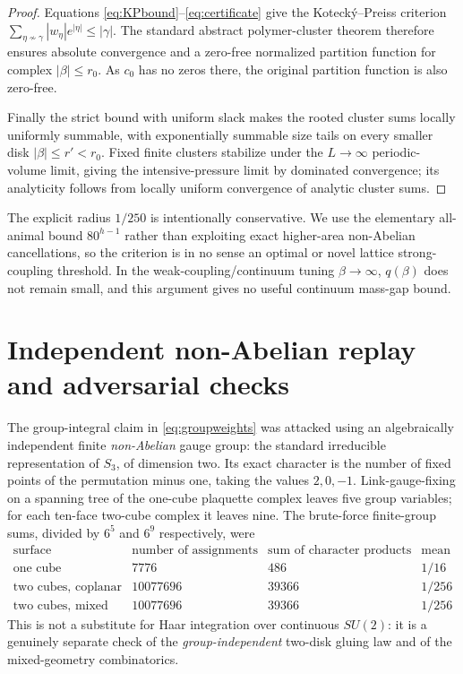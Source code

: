 \documentclass[11pt,a4paper]{article}
\begin{document}
\begin{proof}
Equations \eqref{eq:KPbound}--\eqref{eq:certificate}
give the Koteck\'y--Preiss criterion
$\sum_{\eta\not\sim\gamma}|w_\eta|e^{|\eta|}
\le|\gamma|$. The standard abstract polymer-cluster
theorem \cite{kp} therefore ensures absolute
convergence and a zero-free normalized partition
function for complex $|\beta|\le r_0$.
As $c_0$ has no zeros there, the original partition
function is also zero-free.

Finally the strict bound with uniform slack
makes the rooted cluster sums locally uniformly
summable, with exponentially summable size tails
on every smaller disk $|\beta|\le r'<r_0$.
Fixed finite clusters stabilize under the
$L\to\infty$ periodic-volume limit, giving the
intensive-pressure limit by dominated convergence;
its analyticity follows from locally uniform
convergence of analytic cluster sums.
\end{proof}

The explicit radius $1/250$ is intentionally
conservative. We use the elementary all-animal
bound $80^{h-1}$ rather than exploiting exact
higher-area non-Abelian cancellations, so the
criterion is in no sense an optimal or novel
lattice strong-coupling threshold. In the
weak-coupling/continuum tuning $\beta\to\infty$,
$q(\beta)$ does not remain small, and this
argument gives no useful continuum mass-gap bound.

\section{Independent non-Abelian replay and adversarial checks}
The group-integral claim in \eqref{eq:groupweights} was attacked using
an algebraically independent finite \emph{non-Abelian} gauge group:
the standard irreducible representation of $S_3$, of dimension two.
Its exact character is the number of fixed points of the permutation
minus one, taking the values $2,0,-1$. Link-gauge-fixing on a spanning
tree of the one-cube plaquette complex leaves five group variables;
for each ten-face two-cube complex it leaves nine. The brute-force
finite-group sums, divided by $6^5$ and $6^9$ respectively, were
\[
\begin{array}{c|c|c|c}
\text{surface}&\text{number of assignments}&
\text{sum of character products}&\text{mean}\\ \hline
\text{one cube}&7776&486&1/16\\
\text{two cubes, coplanar}&10077696&39366&1/256\\
\text{two cubes, mixed}&10077696&39366&1/256
\end{array}
\]
This is not a substitute for Haar integration over continuous
$SU(2)$: it is a genuinely separate check of the \emph{group-independent}
two-disk gluing law and of the mixed-geometry combinatorics.
\end{document}

